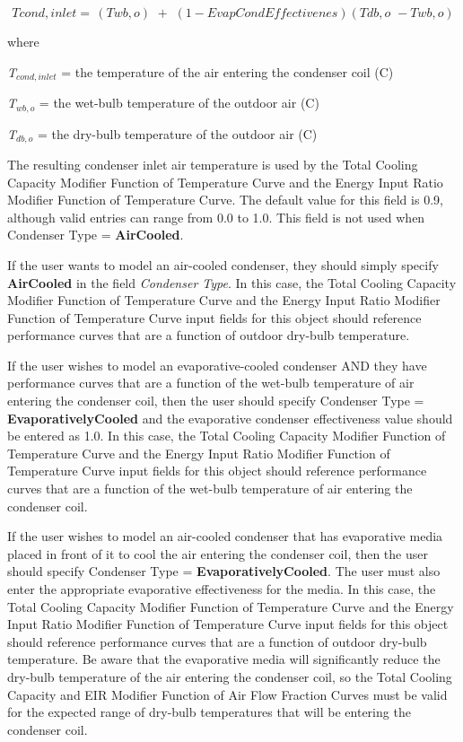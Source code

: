 \begin{equation}
Tcond,inlet = \,\left( {Twb,o} \right)\,\, + \,\,\left( {1 - EvapCondEffectivenes} \right)\left( {Tdb,o\,\, - Twb,o} \right)
\end{equation}

where

\emph{T\(_{cond,inlet}\)} = the temperature of the air entering the condenser coil (C)

\emph{T\(_{wb,o}\)} = the wet-bulb temperature of the outdoor air (C)

\emph{T\(_{db,o}\)} = the dry-bulb temperature of the outdoor air (C)

The resulting condenser inlet air temperature is used by the Total Cooling Capacity Modifier Function of Temperature Curve and the Energy Input Ratio Modifier Function of Temperature Curve. The default value for this field is 0.9, although valid entries can range from 0.0 to 1.0. This field is not used when Condenser Type = \textbf{AirCooled}.

If the user wants to model an air-cooled condenser, they should simply specify \textbf{AirCooled} in the field \textit{Condenser Type}. In this case, the Total Cooling Capacity Modifier Function of Temperature Curve and the Energy Input Ratio Modifier Function of Temperature Curve input fields for this object should reference performance curves that are a function of outdoor dry-bulb temperature.

If the user wishes to model an evaporative-cooled condenser AND they have performance curves that are a function of the wet-bulb temperature of air entering the condenser coil, then the user should specify Condenser Type = \textbf{EvaporativelyCooled} and the evaporative condenser effectiveness value should be entered as 1.0. In this case, the Total Cooling Capacity Modifier Function of Temperature Curve and the Energy Input Ratio Modifier Function of Temperature Curve input fields for this object should reference performance curves that are a function of the wet-bulb temperature of air entering the condenser coil.

If the user wishes to model an air-cooled condenser that has evaporative media placed in front of it to cool the air entering the condenser coil, then the user should specify Condenser Type = \textbf{EvaporativelyCooled}. The user must also enter the appropriate evaporative effectiveness for the media. In this case, the Total Cooling Capacity Modifier Function of Temperature Curve and the Energy Input Ratio Modifier Function of Temperature Curve input fields for this object should reference performance curves that are a function of outdoor dry-bulb temperature. Be aware that the evaporative media will significantly reduce the dry-bulb temperature of the air entering the condenser coil, so the Total Cooling Capacity and EIR Modifier Function of Air Flow Fraction Curves must be valid for the expected range of dry-bulb temperatures that will be entering the condenser coil.

